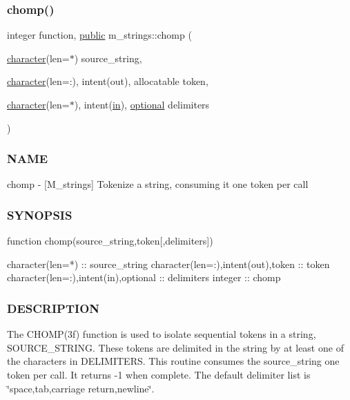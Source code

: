 \subsubsection{\texorpdfstring{chomp()}{chomp()}}
{\footnotesize\ttfamily integer function, \hyperlink{M__stopwatch_83_8txt_a2f74811300c361e53b430611a7d1769f}{public} m\+\_\+strings\+::chomp (\begin{DoxyParamCaption}\item[{\hyperlink{option__stopwatch_83_8txt_abd4b21fbbd175834027b5224bfe97e66}{character}(len=$\ast$)}]{source\+\_\+string,  }\item[{\hyperlink{option__stopwatch_83_8txt_abd4b21fbbd175834027b5224bfe97e66}{character}(len=\+:), intent(out), allocatable}]{token,  }\item[{\hyperlink{option__stopwatch_83_8txt_abd4b21fbbd175834027b5224bfe97e66}{character}(len=$\ast$), intent(\hyperlink{M__journal_83_8txt_afce72651d1eed785a2132bee863b2f38}{in}), \hyperlink{option__stopwatch_83_8txt_aa4ece75e7acf58a4843f70fe18c3ade5}{optional}}]{delimiters }\end{DoxyParamCaption})}



\subsubsection*{N\+A\+ME}

chomp -\/ \mbox{[}M\+\_\+strings\mbox{]} Tokenize a string, consuming it one token per call 

\subsubsection*{S\+Y\+N\+O\+P\+S\+IS}

\begin{DoxyVerb}function chomp(source_string,token[,delimiters])

 character(len=*)                     :: source_string
 character(len=:),intent(out),token   :: token
 character(len=:),intent(in),optional :: delimiters
 integer                              :: chomp
\end{DoxyVerb}


\subsubsection*{D\+E\+S\+C\+R\+I\+P\+T\+I\+ON}

The C\+H\+O\+M\+P(3f) function is used to isolate sequential tokens in a string, S\+O\+U\+R\+C\+E\+\_\+\+S\+T\+R\+I\+NG. These tokens are delimited in the string by at least one of the characters in D\+E\+L\+I\+M\+I\+T\+E\+RS. This routine consumes the source\+\_\+string one token per call. It returns -\/1 when complete. The default delimiter list is \char`\"{}space,tab,carriage return,newline\char`\"{}.

